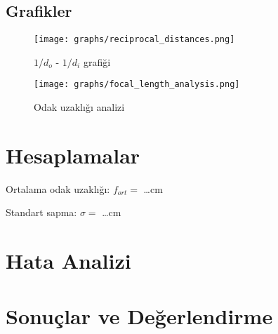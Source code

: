 \documentclass[12pt,a4paper]{article}
\begin{document}
\subsection{Grafikler}
\begin{figure}[H]
\centering
\texttt{[image: graphs/reciprocal\_distances.png]}
\caption{$1/d_o$ - $1/d_i$ grafiği}
\end{figure}

\begin{figure}[H]
\centering
\texttt{[image: graphs/focal\_length\_analysis.png]}
\caption{Odak uzaklığı analizi}
\end{figure}

\section{Hesaplamalar}
Ortalama odak uzaklığı: $f_{ort} = $ \ldots cm

Standart sapma: $\sigma = $ \ldots cm

\section{Hata Analizi}

\section{Sonuçlar ve Değerlendirme}
\end{document}
